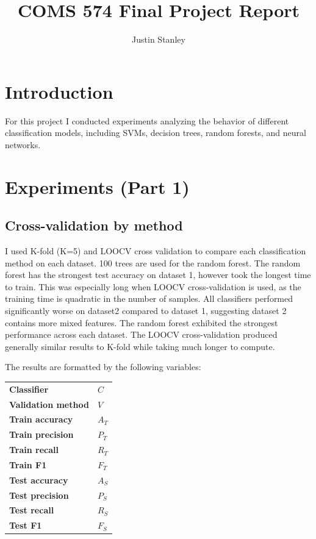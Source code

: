 \documentclass{article}
\begin{document}
\title{COMS 574 Final Project Report}
\author{Justin Stanley}

\maketitle

\section{Introduction}

For this project I conducted experiments analyzing the behavior of different classification models, including SVMs, decision trees, random forests, and neural networks.

\section{Experiments (Part 1)}

\subsection{Cross-validation by method}

I used K-fold (K=5) and LOOCV cross validation to compare each classification method on each dataset. 100 trees are used for the random forest. The random forest has the strongest test accuracy on dataset 1, however took the longest time to train. This was especially long when LOOCV cross-validation is used, as the training time is quadratic in the number of samples. All classifiers performed significantly worse on dataset2 compared to dataset 1, suggesting dataset 2 contains more mixed features. The random forest exhibited the strongest performance across each dataset. The LOOCV cross-validation produced generally similar results to K-fold while taking much longer to compute.

\newpage

The results are formatted by the following variables:
\begin{center}
    \begin{tabular}{l l}
        \textbf{Classifier} & $C$ \\
        \textbf{Validation method} & $V$ \\
        \textbf{Train accuracy} & $A_T$ \\
        \textbf{Train precision} & $P_T$ \\
        \textbf{Train recall} & $R_T$ \\
        \textbf{Train F1} & $F_T$ \\
        \textbf{Test accuracy} & $A_S$ \\
        \textbf{Test precision} & $P_S$ \\
        \textbf{Test recall} & $R_S$ \\
        \textbf{Test F1} & $F_S$ \\
    \end{tabular}
\end{center}
\end{document}

